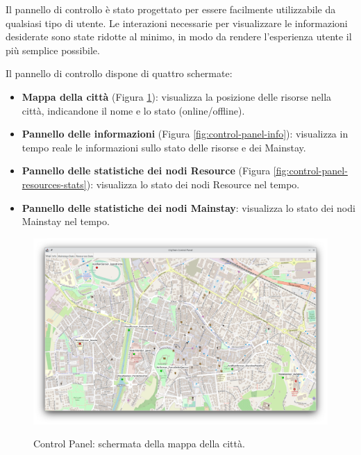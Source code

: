 \documentclass[12pt]{article}
\begin{document}
Il pannello di controllo è stato progettato per essere facilmente utilizzabile da qualsiasi tipo di utente. Le interazioni necessarie per visualizzare le informazioni desiderate sono state ridotte al minimo, in modo da rendere l'esperienza utente il più semplice possibile.

Il pannello di controllo dispone di quattro schermate:

\begin{itemize}
    \item \textbf{Mappa della città} (Figura \ref{fig:control-panel-map}): visualizza la posizione delle risorse nella città, indicandone il nome e lo stato (online/offline).
    \item \textbf{Pannello delle informazioni} (Figura \ref{fig:control-panel-info}): visualizza in tempo reale le informazioni sullo stato delle risorse e dei Mainstay.
    \item \textbf{Pannello delle statistiche dei nodi Resource} (Figura \ref{fig:control-panel-resources-stats}): visualizza lo stato dei nodi Resource nel tempo.
    \item \textbf{Pannello delle statistiche dei nodi Mainstay}: visualizza lo stato dei nodi Mainstay nel tempo.
\end{itemize}

\begin{figure}[H]
    \caption{Control Panel: schermata della mappa della città.}
    \includegraphics[width=\textwidth]{../assets/images/control-panel-map.png}
    \label{fig:control-panel-map}
\end{figure}
\end{document}
